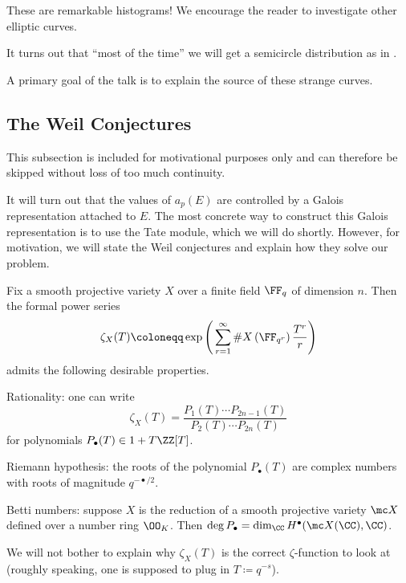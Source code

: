 \documentclass{article}
\begin{document}
These are remarkable histograms! We encourage the reader to investigate other elliptic curves.
\begin{remark}
	It turns out that ``most of the time'' we will get a semicircle distribution as in .
\end{remark}
A primary goal of the talk is to explain the source of these strange curves.

\subsection{The Weil Conjectures} \label{subsec:weil}
This subsection is included for motivational purposes only and can therefore be skipped without loss of too much continuity.

It will turn out that the values of $a_p(E)$ are controlled by a Galois representation attached to $E$. The most concrete way to construct this Galois representation is to use the Tate module, which we will do shortly. However, for motivation, we will state the Weil conjectures and explain how they solve our problem.
\begin{theorem} \label{thm:weil-conj}
	Fix a smooth projective variety $X$ over a finite field $\FF_q$ of dimension $n$. Then the formal power series
	\[\zeta_X(T)\coloneqq\exp\Bigg(\sum_{r=1}^\infty\#X\left(\FF_{q^r}\right)\frac{T^r}r\Bigg)\]
	admits the following desirable properties.
	\begin{listalph}
		\item Rationality: one can write
		\[\zeta_X(T)=\frac{P_1(T)\cdots P_{2n-1}(T)}{P_2(T)\cdots P_{2n}(T)}\]
		for polynomials $P_\bullet(T)\in 1+T\ZZ[T]$.
		\item Riemann hypothesis: the roots of the polynomial $P_\bullet(T)$ are complex numbers with roots of magnitude $q^{-\bullet/2}$.
		\item Betti numbers: suppose $X$ is the reduction of a smooth projective variety $\mc X$ defined over a number ring $\OO_K$. Then $\deg P_\bullet=\dim_\CC H^\bullet(\mc X(\CC),\CC)$.
	\end{listalph}
\end{theorem}
We will not bother to explain why $\zeta_X(T)$ is the correct $\zeta$-function to look at (roughly speaking, one is supposed to plug in $T\coloneqq q^{-s}$).
\end{document}
